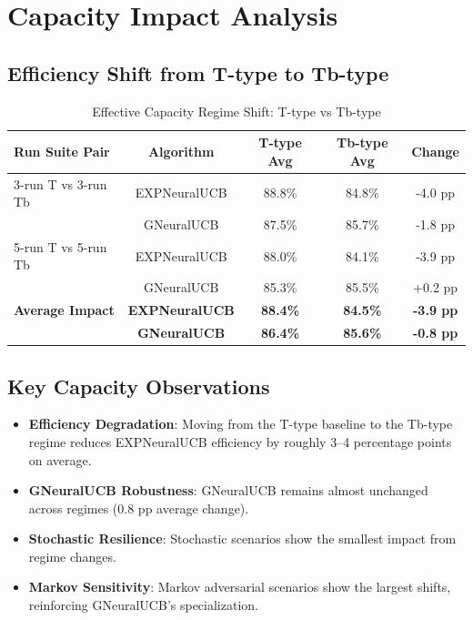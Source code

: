 \documentclass[11pt,a4paper]{article}
\newcommand{\performance}[1]{\textcolor{performancecolor}{\textbf{#1}}}
\newcommand{\critical}[1]{\textcolor{criticalcolor}{\textbf{#1}}}
\newcommand{\success}[1]{\textcolor{successcolor}{\textbf{#1}}}
\begin{document}
\section{Capacity Impact Analysis}

\subsection{Efficiency Shift from T-type to Tb-type}

\begin{table}[H]
\centering
\caption{Effective Capacity Regime Shift: T-type vs Tb-type}
\begin{tabular}{|l|c|c|c|c|}
\hline
\textbf{Run Suite Pair} & \textbf{Algorithm} & \textbf{T-type Avg} & \textbf{Tb-type Avg} & \textbf{Change} \\
\hline
\hline
3-run T vs 3-run Tb & EXPNeuralUCB & 88.8\% & 84.8\% & -4.0 pp \\
                    & GNeuralUCB   & 87.5\% & 85.7\% & -1.8 pp \\
\hline
5-run T vs 5-run Tb & EXPNeuralUCB & 88.0\% & 84.1\% & -3.9 pp \\
                    & GNeuralUCB   & 85.3\% & 85.5\% & +0.2 pp \\
\hline
\textbf{Average Impact} & \textbf{EXPNeuralUCB} & \textbf{88.4\%} & \textbf{84.5\%} & \textbf{-3.9 pp} \\
                        & \textbf{GNeuralUCB}   & \textbf{86.4\%} & \textbf{85.6\%} & \textbf{-0.8 pp} \\
\hline
\end{tabular}
\end{table}

\subsection{Key Capacity Observations}

\begin{itemize}
\item \critical{Efficiency Degradation}: Moving from the T-type baseline to the Tb-type regime reduces EXPNeuralUCB efficiency by roughly 3--4 percentage points on average.
\item \success{GNeuralUCB Robustness}: GNeuralUCB remains almost unchanged across regimes (0.8 pp average change).
\item \performance{Stochastic Resilience}: Stochastic scenarios show the smallest impact from regime changes.
\item \critical{Markov Sensitivity}: Markov adversarial scenarios show the largest shifts, reinforcing GNeuralUCB's specialization.
\end{itemize}
\end{document}

